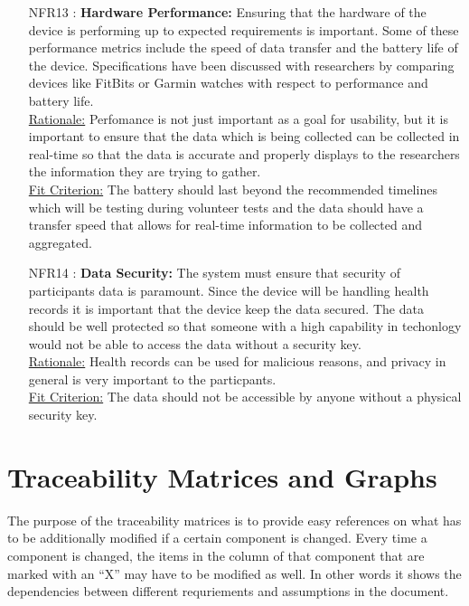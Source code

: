 \documentclass[12pt]{article}
\begin{document}
\begin{itemize}
\item[NFR13 \label{NFR13}:]
  \textbf{Hardware Performance:} Ensuring that the hardware of the device is performing up to expected requirements is important. Some of these performance metrics include the speed of data transfer and the battery life of the device. Specifications have been discussed with researchers by comparing devices like FitBits or Garmin watches with respect to performance and battery life.\\

\underline{Rationale:} Perfomance is not just important as a goal for usability, but it is important to ensure that the data which is being collected can be collected in real-time so that the data is accurate and properly displays to the researchers the information they are trying to gather.\\

\underline{Fit Criterion:} The battery should last beyond the recommended timelines which will be testing during volunteer tests and the data should have a transfer speed that allows for real-time information to be collected and aggregated.\\


\item[NFR14 \label{NFR14}:]
  \textbf{Data Security:} The system must ensure that security of participants data is paramount. Since the device will be handling health records it is important that the device keep the data secured. The data should be well protected so that someone with a high capability in techonlogy would not be able to access the data without a security key.\\

\underline{Rationale:} Health records can be used for malicious reasons, and privacy in general is very important to the particpants.\\

\underline{Fit Criterion:} The data should not be accessible by anyone without a physical security key.\\


\end{itemize}
\newpage
\section{Traceability Matrices and Graphs}
\label{TMG}

The purpose of the traceability matrices is to provide easy references on what
has to be additionally modified if a certain component is changed. Every time a
component is changed, the items in the column of that component that are marked
with an ``X'' may have to be modified as well. In other words it shows the dependencies 
between different requriements and assumptions in the document. \\
\end{document}

